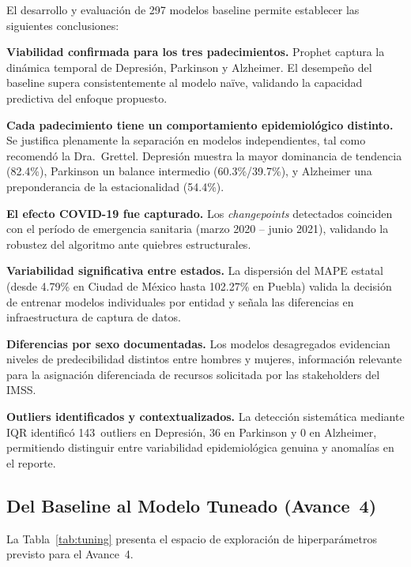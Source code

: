 \documentclass[11pt,a4paper]{article}
\begin{document}
El desarrollo y evaluación de 297 modelos baseline permite establecer las siguientes conclusiones:

\textbf{Viabilidad confirmada para los tres padecimientos.} Prophet captura la dinámica temporal de Depresión, Parkinson y Alzheimer. El desempeño del baseline supera consistentemente al modelo naïve, validando la capacidad predictiva del enfoque propuesto.

\textbf{Cada padecimiento tiene un comportamiento epidemiológico distinto.} Se justifica plenamente la separación en modelos independientes, tal como recomendó la Dra.\ Grettel. Depresión muestra la mayor dominancia de tendencia (82.4\%), Parkinson un balance intermedio (60.3\%/39.7\%), y Alzheimer una preponderancia de la estacionalidad (54.4\%).

\textbf{El efecto COVID-19 fue capturado.} Los \emph{changepoints} detectados coinciden con el período de emergencia sanitaria (marzo 2020 -- junio 2021), validando la robustez del algoritmo ante quiebres estructurales.

\textbf{Variabilidad significativa entre estados.} La dispersión del MAPE estatal (desde 4.79\% en Ciudad de México hasta 102.27\% en Puebla) valida la decisión de entrenar modelos individuales por entidad y señala las diferencias en infraestructura de captura de datos.

\textbf{Diferencias por sexo documentadas.} Los modelos desagregados evidencian niveles de predecibilidad distintos entre hombres y mujeres, información relevante para la asignación diferenciada de recursos solicitada por las stakeholders del IMSS.

\textbf{Outliers identificados y contextualizados.} La detección sistemática mediante IQR identificó 143~outliers en Depresión, 36 en Parkinson y 0 en Alzheimer, permitiendo distinguir entre variabilidad epidemiológica genuina y anomalías en el reporte.

\subsection{Del Baseline al Modelo Tuneado (Avance~4)}

La Tabla~\ref{tab:tuning} presenta el espacio de exploración de hiperparámetros previsto para el Avance~4.
\end{document}
